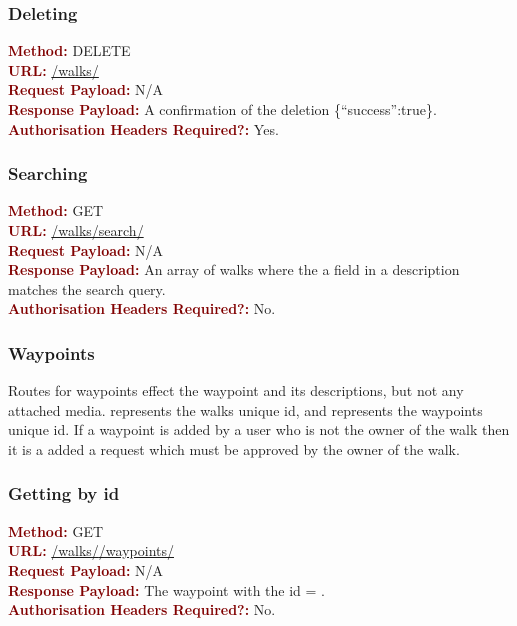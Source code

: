 \documentclass[11pt,a4paper]{report}
\begin{document}
\subsubsection{Deleting}
\textbf{\textcolor{Maroon}{Method:}} DELETE\\
\textbf{\textcolor{Maroon}{URL:}} \url{/walks/}\\
\textbf{\textcolor{Maroon}{Request Payload:}} N/A\\
\textbf{\textcolor{Maroon}{Response Payload:}} A confirmation of the deletion \{``success'':true\}.\\
\textbf{\textcolor{Maroon}{Authorisation Headers Required?:}} Yes.

\subsubsection{Searching}
\textbf{\textcolor{Maroon}{Method:}} GET\\
\textbf{\textcolor{Maroon}{URL:}} \url{/walks/search/}\\
\textbf{\textcolor{Maroon}{Request Payload:}} N/A\\
\textbf{\textcolor{Maroon}{Response Payload:}} An array of walks where the a field in a description matches the search query.\\
\textbf{\textcolor{Maroon}{Authorisation Headers Required?:}} No.

\subsubsection{Waypoints}

Routes for waypoints effect the waypoint and its descriptions, but not any attached media.  represents the walks unique id, and  represents the waypoints unique id. If a waypoint is added by a user who is not the owner of the walk then it is a added a request which must be approved by the owner of the walk.

\subsubsection{Getting by id}
\textbf{\textcolor{Maroon}{Method:}} GET\\
\textbf{\textcolor{Maroon}{URL:}} \url{/walks/}\url{/waypoints/}\\
\textbf{\textcolor{Maroon}{Request Payload:}} N/A\\
\textbf{\textcolor{Maroon}{Response Payload:}} The waypoint with the id = .\\
\textbf{\textcolor{Maroon}{Authorisation Headers Required?:}} No.
\end{document}
